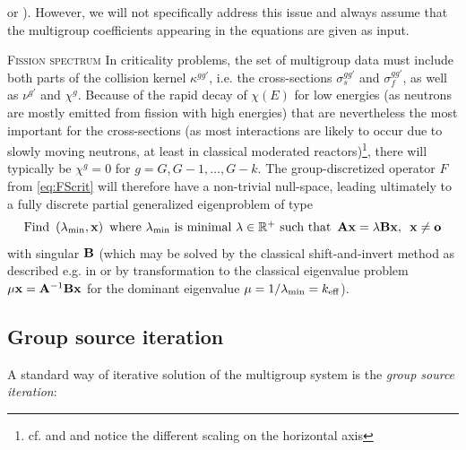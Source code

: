 \cite[Chap.~5]{Cacuci1} or \cite{Cho1}). However, we will not specifically address this issue and always assume that 
the multigroup coefficients appearing in the equations are given as input.
\begin{remark}{\textsc{Fission spectrum}}
In criticality problems, the set of multigroup data must include both parts of the collision kernel
$\kappa^{gg'}$, i.e. the cross-sections $\sigma_s^{gg'}$ and $\sigma_f^{gg'}$, as well as $\nu^{g'}$ and
$\chi^g$. Because of the rapid
decay of $\chi(E)$ for low energies (as neutrons are mostly emitted from fission with high energies) that are
nevertheless the most important for the cross-sections (as most interactions are likely to occur due to slowly moving
neutrons, at least in classical moderated reactors)\footnote{cf.  and  and notice the
different scaling on the horizontal axis}, there will typically be $\chi^g = 0$ for $g = G,G-1,\ldots,G-k$. The
group-discretized operator $F$ from \eqref{eq:FScrit} will therefore have a non-trivial null-space, leading ultimately
to a fully discrete partial generalized eigenproblem of type 
\begin{equation}\label{eq:discrete_eigenproblem}
	\mbox{Find }\, (\lambda_{\text{min}},\mat{x})\, \mbox{ where $\lambda_{\text{min}}$ is minimal $\lambda\in\R[+]$ such
	that }\,
	\mat{A}\mat{x} = \lambda\mat{B}\mat{x},\ \, \mat{x} \neq \mat{o}
\end{equation}
with singular $\mat{B}$ (which may be solved by the classical shift-and-invert method as described e.g. in
\cite{slepc1} or by transformation to the classical eigenvalue problem $\mu\mat{x} = \mat{A}^{-1}\mat{B}\mat{x}$ for 
the dominant eigenvalue $\mu = 1/\lambda_{\text{min}} = \keff$).
\end{remark}


\subsection{Group source iteration}
A standard way of iterative solution of the multigroup system is the \textit{group source iteration}:\\[.4em] 

